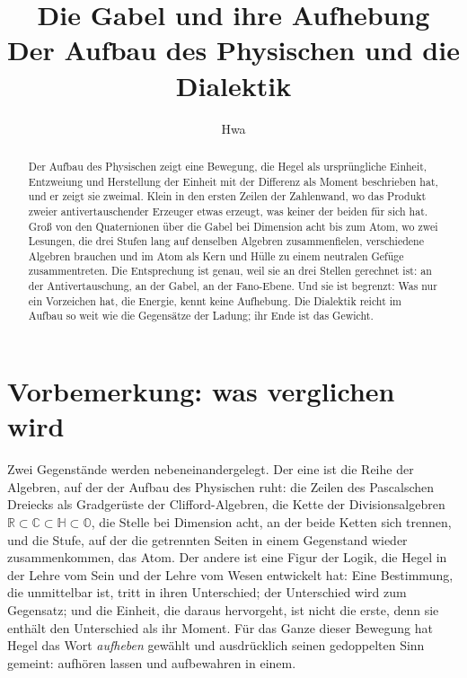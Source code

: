 \documentclass[11pt,a4paper]{article}
\title{Die Gabel und ihre Aufhebung\\[4pt]\large Der Aufbau des Physischen und die Dialektik}
\author{Hwa}
\date{}
\newcommand{\R}{\mathbb R}
\newcommand{\C}{\mathbb C}
\newcommand{\HH}{\mathbb H}
\newcommand{\Oc}{\mathbb O}
\begin{document}
\maketitle

\begin{abstract}
\noindent Der Aufbau des Physischen zeigt eine Bewegung, die Hegel als ursprüngliche Einheit, Entzweiung und Herstellung der Einheit mit der Differenz als Moment beschrieben hat, und er zeigt sie zweimal. Klein in den ersten Zeilen der Zahlenwand, wo das Produkt zweier antivertauschender Erzeuger etwas erzeugt, was keiner der beiden für sich hat. Groß von den Quaternionen über die Gabel bei Dimension acht bis zum Atom, wo zwei Lesungen, die drei Stufen lang auf denselben Algebren zusammenfielen, verschiedene Algebren brauchen und im Atom als Kern und Hülle zu einem neutralen Gefüge zusammentreten. Die Entsprechung ist genau, weil sie an drei Stellen gerechnet ist: an der Antivertauschung, an der Gabel, an der Fano-Ebene. Und sie ist begrenzt: Was nur ein Vorzeichen hat, die Energie, kennt keine Aufhebung. Die Dialektik reicht im Aufbau so weit wie die Gegensätze der Ladung; ihr Ende ist das Gewicht.
\end{abstract}

\tableofcontents
\bigskip

\section*{Vorbemerkung: was verglichen wird}

Zwei Gegenstände werden nebeneinandergelegt. Der eine ist die Reihe der Algebren, auf der der Aufbau des Physischen ruht: die Zeilen des Pascalschen Dreiecks als Gradgerüste der Clifford-Algebren, die Kette der Divisionsalgebren $\R\subset\C\subset\HH\subset\Oc$, die Stelle bei Dimension acht, an der beide Ketten sich trennen, und die Stufe, auf der die getrennten Seiten in einem Gegenstand wieder zusammenkommen, das Atom. Der andere ist eine Figur der Logik, die Hegel in der Lehre vom Sein und der Lehre vom Wesen entwickelt hat: Eine Bestimmung, die unmittelbar ist, tritt in ihren Unterschied; der Unterschied wird zum Gegensatz; und die Einheit, die daraus hervorgeht, ist nicht die erste, denn sie enthält den Unterschied als ihr Moment. Für das Ganze dieser Bewegung hat Hegel das Wort \emph{aufheben} gewählt und ausdrücklich seinen gedoppelten Sinn gemeint: aufhören lassen und aufbewahren in einem.
\end{document}

